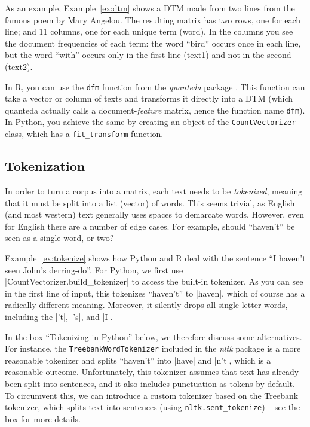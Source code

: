 
As an example, Example~\ref{ex:dtm} shows a DTM made from two lines from the famous poem by Mary Angelou.
The resulting matrix has two rows, one for each line; and 11 columns, one for each unique term (word).
In the columns you see the document frequencies of each term: the word ``bird'' occurs once in each line,
but the word ``with'' occurs only in the first line (text1) and not in the second (text2).

In R, you can use the \texttt{dfm} function from the \emph{quanteda} package \citep{quanteda}.
This function can take a vector or column of texts and transforms it directly into a DTM
(which quanteda actually calls a document-\emph{feature} matrix, hence the function name \texttt{dfm}).
In Python, you achieve the same by creating an object of the \texttt{CountVectorizer} class, which has a \texttt{fit\_transform} function.


\subsection{Tokenization}

In order to turn a corpus into a matrix, each text needs to be \emph{tokenized},
meaning that it must be split into a list (vector) of words.
This seems trivial, as English (and most western) text generally uses spaces to demarcate words.
However, even for English there are a number of edge cases.
For example, should ``haven't'' be seen as a single word, or two?


Example~\ref{ex:tokenize} shows how Python and R deal with the sentence ``I haven't seen John's derring-do''.
For Python, we first use |CountVectorizer.build_tokenizer| to access the built-in tokenizer.
As you can see in the first line of input, this tokenizes ``haven't'' to |haven|,
which of course has a radically different meaning. Moreover, it silently drops all single-letter words,
including the |'t|, |'s|, and |I|.

In the box ``Tokenizing in Python'' below, we therefore discuss some alternatives. For instance, the \texttt{TreebankWordTokenizer} included in the \emph{nltk} package is a more reasonable tokenizer and
splits ``haven't'' into |have| and |n't|, which is a reasonable outcome.
Unfortunately, this tokenizer assumes that text has already been split into sentences,
and it also includes punctuation as tokens by default.
To circumvent this, we can introduce a custom tokenizer based on the Treebank tokenizer,
which splits text into sentences (using \texttt{nltk.sent\_tokenize}) -- see the box for more details.

